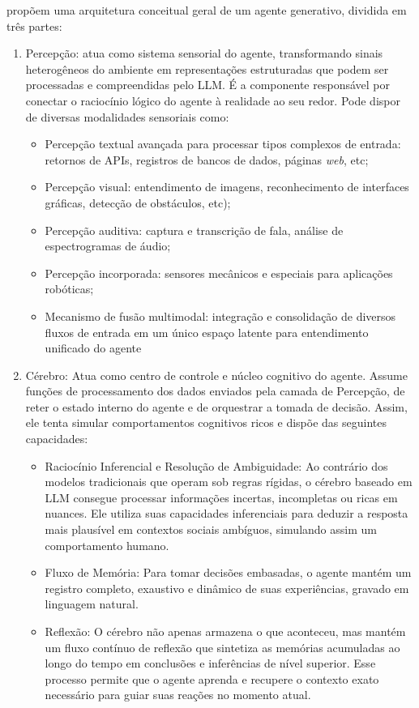 \documentclass[12pt,oneside,a4paper,brazil,sumario=tradicional]{abntex2}
\begin{document}
\textcite{xi2023} propõem uma arquitetura conceitual geral de um agente generativo, dividida em três partes:

\begin{enumerate}
  \item Percepção: atua como sistema sensorial do agente, transformando sinais heterogêneos do ambiente em representações estruturadas que podem ser processadas e compreendidas pelo LLM. É a componente responsável por conectar o raciocínio lógico do agente à realidade ao seu redor. Pode dispor de diversas modalidades sensoriais como:
  \begin{itemize}
  \item Percepção textual avançada para processar tipos complexos de entrada: retornos de APIs, registros de bancos de dados, páginas \textit{web}, etc;
  \item Percepção visual: entendimento de imagens,  reconhecimento de interfaces gráficas, detecção de obstáculos, etc);
  \item Percepção auditiva: captura e transcrição de fala, análise de espectrogramas de áudio;
  \item Percepção incorporada: sensores mecânicos e especiais para aplicações robóticas;
  \item Mecanismo de fusão multimodal: integração e consolidação de diversos fluxos de entrada em um único espaço latente para entendimento unificado do agente
  \end{itemize}
  \item Cérebro: Atua como centro de controle e núcleo cognitivo do agente. Assume funções de processamento dos dados enviados pela camada de Percepção, de reter o estado interno do agente e de orquestrar a tomada de decisão. Assim, ele tenta simular comportamentos cognitivos ricos e dispõe das seguintes capacidades:
  \begin{itemize}
  \item Raciocínio Inferencial e Resolução de Ambiguidade: Ao contrário dos modelos tradicionais que operam sob regras rígidas, o cérebro baseado em LLM consegue processar informações incertas, incompletas ou ricas em nuances. Ele utiliza suas capacidades inferenciais para deduzir a resposta mais plausível em contextos sociais ambíguos, simulando assim um comportamento humano.
  \item Fluxo de Memória: Para tomar decisões embasadas, o agente mantém um registro completo, exaustivo e dinâmico de suas experiências, gravado em linguagem natural.
  \item Reflexão: O cérebro não apenas armazena o que aconteceu, mas mantém um fluxo contínuo de reflexão que sintetiza as memórias acumuladas ao longo do tempo em conclusões e inferências de nível superior. Esse processo permite que o agente aprenda e recupere o contexto exato necessário para guiar suas reações no momento atual.

\end{itemize}
\end{enumerate}
\end{document}
